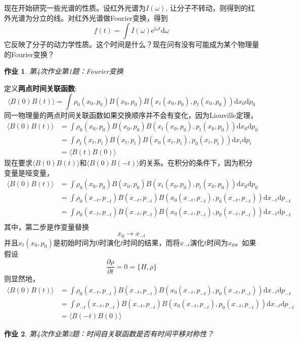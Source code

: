 \documentclass[12pt]{article}
\newtheorem{asg}{作业}
\begin{document}
现在开始研究一些光谱的性质。设红外光谱为$I(\omega)$, 让分子不转动，则得到的红外光谱为分立的线。对红外光谱做Fourier变换，得到
\begin{equation*}
f(t) = \int I(\omega)\mathrm{e}^{\mathrm{i}\omega t}\mathrm{d}\omega 
\end{equation*}
它反映了分子的动力学性质。这个时间是什么？现在问有没有可能成为某个物理量的Fourier变换？
\begin{asg}
    第4次作业第1题：Fourier变换
\end{asg}
定义\textbf{两点时间关联函数}:
\begin{equation*}
\langle B(0)B(t) \rangle = \int \rho_0(x_0,p_0) B(x_0,p_0) B(x_t(x_0,p_0),p_t(x_0,p_0)) \mathrm{d}x_0 \mathrm{d}p_0
\end{equation*}
同一物理量的两点时间关联函数如果交换顺序并不会有变化，因为Liouville定理，
\begin{align*}
\langle B(0)B(t) \rangle &= \int \rho_0(x_0,p_0) B(x_0,p_0) B(x_t(x_0,p_0),p_t(x_0,p_0)) \mathrm{d}x_0 \mathrm{d}p_0\\
&= \int \rho_t(x_t,p_t) B(x_t,p_t) B(x_0(x_t,p_t),p_0(x_t,p_t)) \mathrm{d}x_t \mathrm{d}p_t\\
&= \langle B(t)B(0) \rangle
\end{align*}
现在要求$\langle B(0)B(t) \rangle$和$\langle B(0)B(-t) \rangle$的关系。在积分的条件下，因为积分变量是哑变量，
\begin{align*}
\langle B(0)B(t) \rangle &= \int \rho_0(x_0,p_0) B(x_0,p_0) B(x_t(x_0,p_0),p_t(x_0,p_0)) \mathrm{d}x_0 \mathrm{d}p_0\\
&= \int \rho_0(x_{-t},p_{-t}) B(x_{-t},p_{-t}) B(x_0(x_{-t},p_{-t}),p_0(x_{-t},p_{-t})) \mathrm{d}x_{-t} \mathrm{d}p_{-t}\\
&= \int \rho_0(x_{-t},p_{-t}) B(x_{-t},p_{-t}) B(x_0(x_{-t},p_{-t}),p_0(x_{-t},p_{-t})) \mathrm{d}x_{-t} \mathrm{d}p_{-t}\\
\end{align*}
其中，第二步是作变量替换
\begin{equation*}
x_0 \to x_{-t}
\end{equation*}
并且$x_t(x_0,p_0)$是初始时间为0时演化$t$时间的结果，而将$x_{-t}$演化$t$时间为$x_0$。如果假设
\begin{equation*}
\frac {\partial \rho}{\partial t} = 0 = \{ H, \rho\}
\end{equation*}
则显然地，
\begin{align*}
    \langle B(0)B(t) \rangle &= \int \rho_0(x_{-t},p_{-t}) B(x_{-t},p_{-t}) B(x_0(x_{-t},p_{-t}),p_0(x_{-t},p_{-t})) \mathrm{d}x_{-t} \mathrm{d}p_{-t}\\
    &= \int \rho_{-t}(x_{-t},p_{-t}) B(x_{-t},p_{-t}) B(x_0(x_{-t},p_{-t}),p_0(x_{-t},p_{-t})) \mathrm{d}x_{-t} \mathrm{d}p_{-t}\\
    &= \langle B(-t)B(0) \rangle
\end{align*}
\begin{asg}
    第4次作业第2题：时间自关联函数是否有时间平移对称性？
\end{asg}
\end{document}
